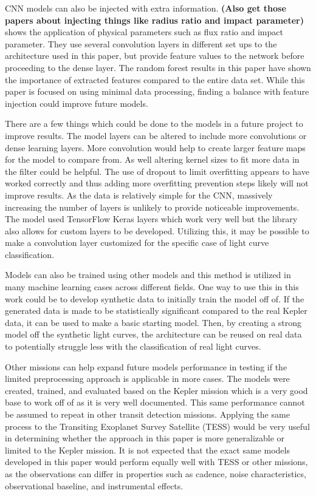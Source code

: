 CNN models can also be injected with extra information. \textbf{(Also get those papers about injecting things like radius ratio and impact parameter)} shows the application of physical parameters such as flux ratio and impact parameter. They use several convolution layers in different set ups to the architecture used in this paper, but provide feature values to the network before proceeding to the dense layer. The random forest results in this paper have shown the importance of extracted features compared to the entire data set. While this paper is focused on using minimal data processing, finding a balance with feature injection could improve future models. 

There are a few things which could be done to the models in a future project to improve results. The model layers can be altered to include more convolutions or dense learning layers. More convolution would help to create larger feature maps for the model to compare from. As well altering kernel sizes to fit more data in the filter could be helpful. The use of dropout to limit overfitting appears to have worked correctly and thus adding more overfitting prevention steps likely will not improve results. As the data is relatively simple for the CNN, massively increasing the number of layers is unlikely to provide noticeable improvements. The model used TensorFlow Keras layers which work very well but the library also allows for custom layers to be developed. Utilizing this, it may be possible to make a convolution layer customized for the specific case of light curve classification. 

Models can also be trained using other models and this method is utilized in many machine learning cases across different fields. One way to use this in this work could be to develop synthetic data to initially train the model off of. If the generated data is made to be statistically significant compared to the real Kepler data, it can be used to make a basic starting model. Then, by creating a strong model off the synthetic light curves, the architecture can be reused on real data to potentially struggle less with the classification of real light curves.  

Other missions can help expand future models performance in testing if the limited preprocessing approach is applicable in more cases. The models were created, trained, and evaluated based on the Kepler mission which is a very good base to work off of as it is very well documented. This same performance cannot be assumed to repeat in other transit detection missions. Applying the same process to the Transiting Exoplanet Survey Satellite (TESS) would be very useful in determining whether the approach in this paper is more generalizable or limited to the Kepler mission. It is not expected that the exact same models developed in this paper would perform equally well with TESS or other missions, as the observations can differ in properties such as cadence, noise characteristics, observational baseline, and instrumental effects.

